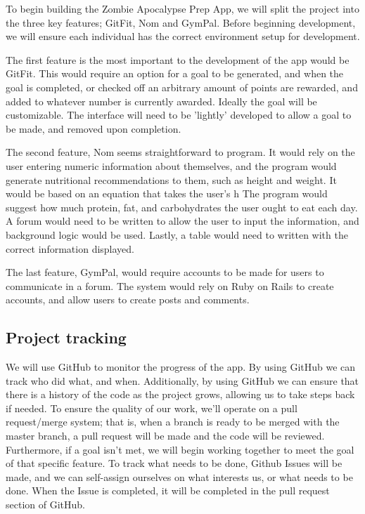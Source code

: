 \documentclass[a4paper]{article}
\begin{document}
\noindent To begin building the Zombie Apocalypse Prep App, we will split the project into the three key features; GitFit, Nom and GymPal. Before beginning development, we will ensure each individual has the correct environment setup for development.\newline

\noindent The first feature is the most important to the development of the app would be GitFit. This would require an option for a goal to be generated, and when the goal is completed, or checked off an arbitrary amount of points are rewarded, and added to whatever number is currently awarded. Ideally the goal will be customizable. The interface will need to be 'lightly' developed to allow a goal to be made, and removed upon completion.\newline

\noindent The second feature, Nom seems straightforward to program. It would rely on the user entering numeric information about themselves, and the program would generate nutritional recommendations to them, such as height and weight. It would be based on an equation that takes the user's h The program would suggest how much protein, fat, and carbohydrates the user ought to eat each day. A forum would need to be written to allow the user to input the information, and background logic would be used. Lastly, a table would need to written with the correct information displayed.\newline

\noindent The last feature, GymPal, would require accounts to be made for users to communicate in a forum. The system would rely on Ruby on Rails to create accounts, and allow users to create posts and comments. 


\subsection{Project tracking} 

We will use GitHub to monitor the progress of the app. By using GitHub we can track who did what, and when. Additionally, by using GitHub we can ensure that there is a history of the code as the project grows, allowing us to take steps back if needed. To ensure the quality of our work, we'll operate on a pull request/merge system; that is, when a branch is ready to be merged with the master branch, a pull request will be made and the code will be reviewed. Furthermore, if a goal isn't met, we will begin working together to meet the goal of that specific feature. To track what needs to be done, Github Issues will be made, and we can self-assign ourselves on what interests us, or what needs to be done. When the Issue is completed, it will be completed in the pull request section of GitHub.\newline
\end{document}
